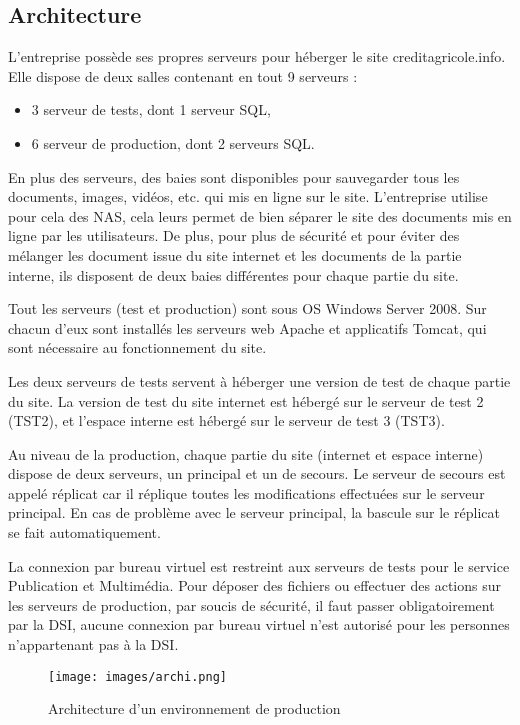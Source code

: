 \documentclass[12pt,a4paper]{article}
\begin{document}
\subsection{Architecture}
L'entreprise possède ses propres serveurs pour héberger le site creditagricole.info. Elle dispose de deux salles contenant en tout 9 serveurs :
\begin{itemize}
\item 3 serveur de tests, dont 1 serveur SQL,
\item 6 serveur de production, dont 2 serveurs SQL.
\end{itemize}
En plus des serveurs, des baies sont disponibles pour sauvegarder tous les documents, images, vidéos, etc. qui mis en ligne sur le site. L'entreprise utilise pour cela des NAS, cela leurs permet de bien séparer le site des documents mis en ligne par les utilisateurs. De plus, pour plus de sécurité et pour éviter des mélanger les document issue du site internet et les documents de la partie interne, ils disposent de deux baies différentes pour chaque partie du site.\par
\medskip
Tout les serveurs (test et production) sont sous OS Windows Server 2008. Sur chacun d'eux sont installés les serveurs web Apache et applicatifs Tomcat, qui sont nécessaire au fonctionnement du site.\par
Les deux serveurs de tests servent à héberger une version de test de chaque partie du site. La version de test du site internet est hébergé sur le serveur de test 2 (TST2), et l'espace interne est hébergé sur le serveur de test 3 (TST3).\par
Au niveau de la production, chaque partie du site (internet et espace interne) dispose de deux serveurs, un principal et un de secours. Le serveur de secours est appelé réplicat car il réplique toutes les modifications effectuées sur le serveur principal. En cas de problème avec le serveur principal, la bascule sur le réplicat se fait automatiquement.\par
La connexion par bureau virtuel est restreint aux serveurs de tests pour le service Publication et Multimédia. Pour déposer des fichiers ou effectuer des actions sur les serveurs de production, par soucis de sécurité, il faut passer obligatoirement par la DSI, aucune connexion par bureau virtuel n'est autorisé pour les personnes n'appartenant pas à la DSI.\par
\begin{figure}[h!]
\centering
\texttt{[image: images/archi.png]} 
\caption{Architecture d'un environnement de production}
\end{figure}
\newpage
\end{document}
